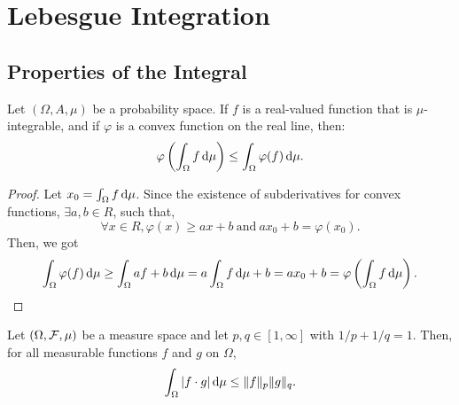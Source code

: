 \chapter{Lebesgue Integration}

\section{Properties of the Integral}

\begin{theorem}
	Let \((\Omega,A,\mu)\) be a probability space. If \(f\) is a real-valued function that is \(\mu\)-integrable, and if \(\varphi\) is a convex function on the real line, then:
	\begin{equation}
		\varphi\left(\int_{\Omega}f\mathop{}\!\mathrm{d}\mu\right)\leq\int_{\Omega}\varphi(f)\mathop{}\!\mathrm{d}\mu.
	\end{equation}
\end{theorem}

\begin{proof}
	Let \(x_{0}=\int_{\Omega}f\mathop{}\!\mathrm{d}\mu\). Since the existence of subderivatives for convex functions, \(\exists a,b\in R\), such that,
	\begin{equation*}
		\forall x\in R,\varphi(x)\geq ax+b\ \text{and}\ ax_0+b=\varphi(x_0).
	\end{equation*}
	Then, we got
	\begin{equation*}
		\int_{\Omega}\varphi(f)\mathop{}\!\mathrm{d}\mu\geq\int_{\Omega}af+b\mathop{}\!\mathrm{d}\mu=a\int_{\Omega}f\mathop{}\!\mathrm{d}\mu+b=ax_0+b=\varphi\left(\int_{\Omega}f\mathop{}\!\mathrm{d}\mu\right).
	\end{equation*}
\end{proof}

\begin{theorem}\label{thm:holder-inequality}
	Let \((\Omega,\mathcal{F},\mu)\) be a measure space and let \(p,q\in[1,\infty]\) with \(1/p+1/q=1\). Then, for all measurable functions \(f\) and \(g\) on \(\Omega\),
	\begin{equation}
		\int_{\Omega}|f\cdot g|\mathop{}\!\mathrm{d}\mu\leq\|f\|_{p}\|g\|_{q}.
	\end{equation}
\end{theorem}

